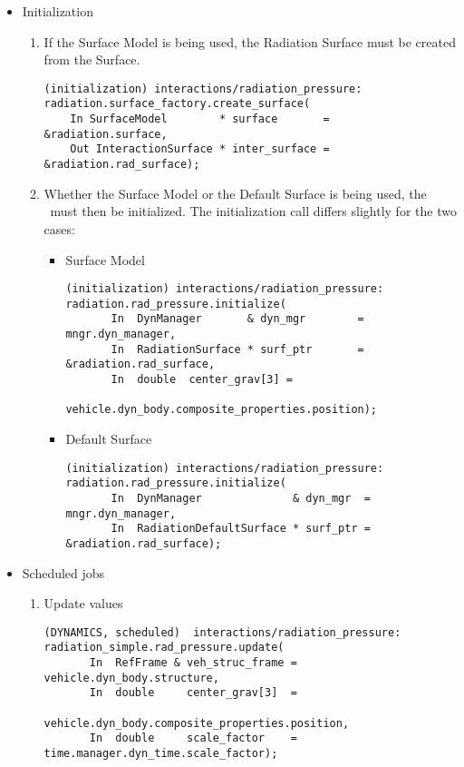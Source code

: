 \begin{enumerate}
\begin{itemize}
      \item {Initialization}
        \begin{enumerate}
          \item{} If the Surface Model is being used,
            the Radiation Surface must be created from the Surface.
\begin{verbatim}
(initialization) interactions/radiation_pressure:
radiation.surface_factory.create_surface(
    In SurfaceModel        * surface       =  &radiation.surface,
    Out InteractionSurface * inter_surface =  &radiation.rad_surface);
\end{verbatim}
          \item{} Whether the Surface Model or the Default Surface is being
            used, the \RadiationPressureDesc\ must then be initialized.
            The initialization call differs slightly for the two cases:
            \begin{itemize}
              \item{Surface Model}
\begin{verbatim}
(initialization) interactions/radiation_pressure:
radiation.rad_pressure.initialize(
       In  DynManager       & dyn_mgr        = mngr.dyn_manager,
       In  RadiationSurface * surf_ptr       = &radiation.rad_surface,
       In  double  center_grav[3] =
                      vehicle.dyn_body.composite_properties.position);
\end{verbatim}
              \item{Default Surface}
\begin{verbatim}
(initialization) interactions/radiation_pressure:
radiation.rad_pressure.initialize(
       In  DynManager              & dyn_mgr  = mngr.dyn_manager,
       In  RadiationDefaultSurface * surf_ptr = &radiation.rad_surface);
\end{verbatim}
            \end{itemize}
        \end{enumerate}


      \item {Scheduled jobs}
        \begin{enumerate}
          \item {Update values}
\begin{verbatim}
(DYNAMICS, scheduled)  interactions/radiation_pressure:
radiation_simple.rad_pressure.update(
       In  RefFrame & veh_struc_frame = vehicle.dyn_body.structure,
       In  double     center_grav[3]  =
                             vehicle.dyn_body.composite_properties.position,
       In  double     scale_factor    = time.manager.dyn_time.scale_factor);
\end{verbatim}


\end{enumerate}
\end{itemize}
\end{enumerate}
